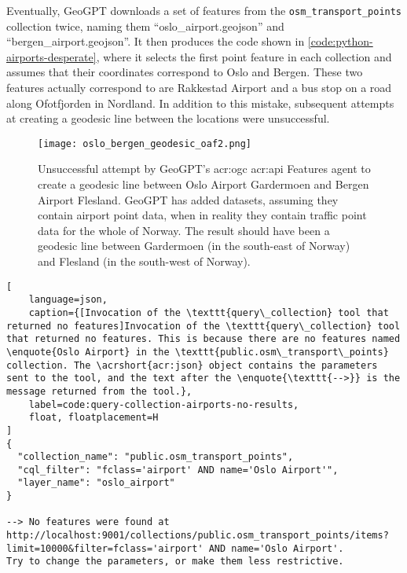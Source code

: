 Eventually, GeoGPT downloads a set of features from the \texttt{osm\_transport\_points} collection twice, naming them \enquote{oslo\_airport.geojson} and \enquote{bergen\_airport.geojson}. It then produces the code shown in \autoref{code:python-airports-desperate}, where it selects the first point feature in each collection and assumes that their coordinates correspond to Oslo and Bergen. These two features actually correspond to are Rakkestad Airport and a bus stop on a road along Ofotfjorden in Nordland. In addition to this mistake, subsequent attempts at creating a geodesic line between the locations were unsuccessful.

\begin{figure}[htbp]
    \centering
    \texttt{[image: oslo\_bergen\_geodesic\_oaf2.png]}
    \caption[Unsuccessful attempt by GeoGPT's OGC API Features agent to create a geodesic line between Oslo Airport Gardermoen and Bergen Airport Flesland]{Unsuccessful attempt by GeoGPT's \acrshort{acr:ogc} \acrshort{acr:api} Features agent to create a geodesic line between Oslo Airport Gardermoen and Bergen Airport Flesland. GeoGPT has added datasets, assuming they contain airport point data, when in reality they contain traffic point data for the whole of Norway. The result should have been a geodesic line between Gardermoen (in the south-east of Norway) and Flesland (in the south-west of Norway).}
    \label{fig:oaf-geodesic-unsuccessful}
\end{figure}


\begin{lstlisting}[
    language=json,
    caption={[Invocation of the \texttt{query\_collection} tool that returned no features]Invocation of the \texttt{query\_collection} tool that returned no features. This is because there are no features named \enquote{Oslo Airport} in the \texttt{public.osm\_transport\_points} collection. The \acrshort{acr:json} object contains the parameters sent to the tool, and the text after the \enquote{\texttt{-->}} is the message returned from the tool.},
    label=code:query-collection-airports-no-results,
    float, floatplacement=H
]
{
  "collection_name": "public.osm_transport_points",
  "cql_filter": "fclass='airport' AND name='Oslo Airport'",
  "layer_name": "oslo_airport"
}

--> No features were found at http://localhost:9001/collections/public.osm_transport_points/items?limit=10000&filter=fclass='airport' AND name='Oslo Airport'.
Try to change the parameters, or make them less restrictive.
\end{lstlisting}

